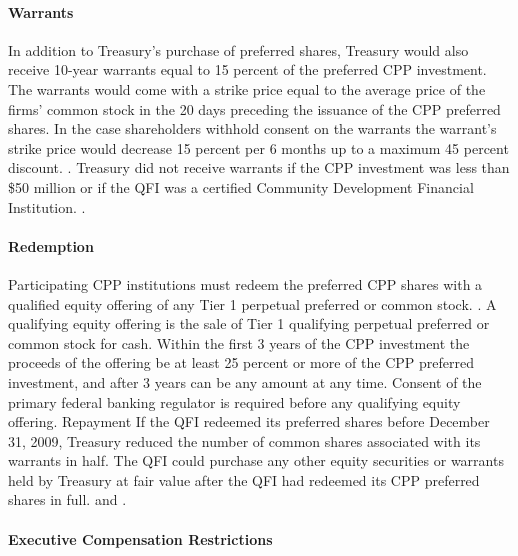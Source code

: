 \documentclass[12pt]{article}
\begin{document}
\paragraph{Warrants}

In addition to Treasury's purchase of preferred shares, Treasury would also receive 10-year warrants equal to 15 percent of the preferred CPP investment. The warrants would come with a strike price equal to the average price of the firms' common stock in the 20 days preceding the issuance of the CPP preferred shares. In the case shareholders withhold consent on the warrants the warrant's strike price would decrease  15 percent per 6 months up to a maximum 45 percent discount. \citep{CPPAnnouncement}. Treasury did not receive warrants if the CPP investment was less than \$50 million or if the QFI was a certified Community Development Financial Institution. \citep{mofo}. 

\paragraph{Redemption}

Participating CPP institutions must redeem the preferred CPP shares with a qualified equity offering of any Tier 1 perpetual preferred or common stock. \citep{CPPAnnouncement}. A qualifying equity offering is the sale of Tier 1 qualifying perpetual preferred or common stock for cash. Within the first 3 years of the CPP investment the proceeds of the offering be at least 25 percent or more of the CPP preferred investment, and after 3 years can be any amount at any time. Consent of the primary federal banking regulator is required before any qualifying equity offering. Repayment  If the QFI redeemed its preferred shares before December 31, 2009, Treasury reduced the number of common shares associated with its warrants in half. The QFI could purchase any other equity securities or warrants held by Treasury at fair value after the QFI had redeemed its CPP preferred shares in full. \citep{CPPTerms} and \citep{mofo2}. 

\paragraph{Executive Compensation Restrictions}
\end{document}

